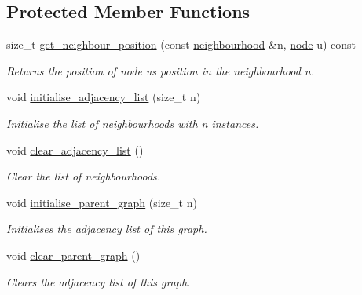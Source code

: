 \subsection*{Protected Member Functions}
\begin{DoxyCompactItemize}
\item 
size\+\_\+t \hyperlink{classlgraph_1_1xxgraph_abb0c474cb162940aba3439124c1202d7}{get\+\_\+neighbour\+\_\+position} (const \hyperlink{namespacelgraph_a052e7766c13f3a43cec0aec8173fdede}{neighbourhood} \&n, \hyperlink{namespacelgraph_a397169dd66adf725210a30fb7251773e}{node} u) const
\begin{DoxyCompactList}\small\item\em Returns the position of node {\itshape u\textquotesingle{}s} position in the neighbourhood {\itshape n}. \end{DoxyCompactList}\item 
\mbox{\label{classlgraph_1_1xxgraph_a682d586f850add8b7e637aeea81b0292}} 
void \hyperlink{classlgraph_1_1xxgraph_a682d586f850add8b7e637aeea81b0292}{initialise\+\_\+adjacency\+\_\+list} (size\+\_\+t n)
\begin{DoxyCompactList}\small\item\em Initialise the list of neighbourhoods with {\itshape n} instances. \end{DoxyCompactList}\item 
\mbox{\label{classlgraph_1_1xxgraph_a6b15c62c68919722f7eb18fe273d45fe}} 
void \hyperlink{classlgraph_1_1xxgraph_a6b15c62c68919722f7eb18fe273d45fe}{clear\+\_\+adjacency\+\_\+list} ()
\begin{DoxyCompactList}\small\item\em Clear the list of neighbourhoods. \end{DoxyCompactList}\item 
void \hyperlink{classlgraph_1_1xxgraph_a50c658dd39e6b1d38bf7e514daa2f33c}{initialise\+\_\+parent\+\_\+graph} (size\+\_\+t n)
\begin{DoxyCompactList}\small\item\em Initialises the adjacency list of this graph. \end{DoxyCompactList}\item 
void \hyperlink{classlgraph_1_1xxgraph_a4122495066e4402cbf6d2d9bb82d54cc}{clear\+\_\+parent\+\_\+graph} ()
\begin{DoxyCompactList}\small\item\em Clears the adjacency list of this graph. \end{DoxyCompactList}\end{DoxyCompactItemize}
